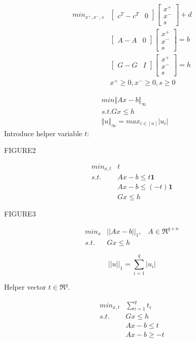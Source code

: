 \begin{align*}
min_{x^{+},x^{-},s} &\begin{bmatrix}
c^T - c^T & 0
\end{bmatrix}
\begin{bmatrix}
x^{+}\\
x^{-}\\
s
\end{bmatrix}+d\\
&\begin{bmatrix}
A-A & 0
\end{bmatrix}
\begin{bmatrix}
x^{+}\\
x^{-}\\
s
\end{bmatrix}=b\\
&\begin{bmatrix}
G-G & I
\end{bmatrix}
\begin{bmatrix}
x^{+}\\
x^{-}\\
s
\end{bmatrix}=h\\
&x^{+}\geq 0, x^{-}\geq 0, s\geq 0
\end{align*}




\begin{example}
	\begin{align*}
	&min \Vert Ax - b\Vert_{\infty}\\
	&s.t. Gx \leq h\\
	&\Vert u\Vert_{\infty} = max_{i\in [n]}|u_i|
	\end{align*}
	Introduce helper variable $t$:
	
	FIGURE2
	
	
	\begin{align*}
	min_{x,t} &t\\
	s.t. &Ax - b\leq t\textbf{1}\\
	&Ax - b\leq (-t)\textbf{1}\\
	&Gx \leq h
	\end{align*}
\end{example}


\begin{example}
	FIGURE3
	
	\begin{align*}
	min_x &||Ax - b||_1, \,\,\,\,\, A\in \Re^{q\times n}\\
	s.t. &Gx\leq h
	\end{align*}
	
	\begin{equation*}
	||u||_1 = \sum^q_{i=1} |u_i|
	\end{equation*}
	
	Helper vector $t\in \Re^q$.
	
	\begin{align*}
	min_{x,t} &\sum^q_{i=1}t_i\\
	s.t. \,\,\,\,\,&Gx \leq h\\
	&Ax -b \leq t\\
	&Ax -b \geq -t
	\end{align*}
\end{example}

